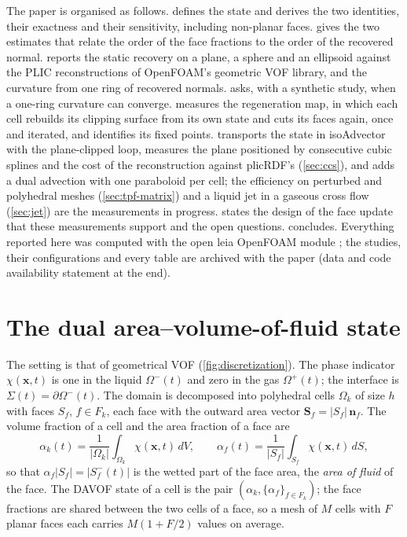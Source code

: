 \documentclass[preprint,12pt]{elsarticle}
\newcommand{\x}{\mathbf{x}}
\newcommand{\n}{\mathbf{n}}
\newcommand{\Sf}{\mathbf{S}_f}
\begin{document}
The paper is organised as follows.  defines the state and derives the two identities, their exactness and their sensitivity, including non-planar faces.  gives the two estimates that relate the order of the face fractions to the order of the recovered normal.  reports the static recovery on a plane, a sphere and an ellipsoid against the PLIC reconstructions of OpenFOAM's geometric VOF library, and the curvature from one ring of recovered normals.  asks, with a synthetic study, when a one-ring curvature can converge.  measures the regeneration map, in which each cell rebuilds its clipping surface from its own state and cuts its faces again, once and iterated, and identifies its fixed points.  transports the state in isoAdvector with the plane-clipped loop, measures the plane positioned by consecutive cubic splines and the cost of the reconstruction against plicRDF's (\cref{sec:ccs}), and adds a dual advection with one paraboloid per cell; the efficiency on perturbed and polyhedral meshes (\cref{sec:tpf-matrix}) and a liquid jet in a gaseous cross flow (\cref{sec:jet}) are the measurements in progress.  states the design of the face update that these measurements support and the open questions.  concludes. Everything reported here was computed with the open leia OpenFOAM module \citep{LeiaRepo2026}; the studies, their configurations and every table are archived with the paper \citep{LeiaRepo2026} (data and code availability statement at the end).

\section{The dual area--volume-of-fluid state}
\label{sec:state}



The setting is that of geometrical VOF (\cref{fig:discretization}). The phase indicator $\chi(\x,t)$ is one in the liquid $\Omega^-(t)$ and zero in the gas $\Omega^+(t)$; the interface is $\Sigma(t) = \partial\Omega^-(t)$. The domain is decomposed into polyhedral cells $\Omega_k$ of size $h$ with faces $S_f$, $f \in F_k$, each face with the outward area vector $\Sf = |S_f|\,\n_f$. The volume fraction of a cell and the area fraction of a face are
\begin{equation}
\alpha_k(t) = \frac{1}{|\Omega_k|}\int_{\Omega_k}\chi(\x,t)\,dV, \qquad
\alpha_f(t) = \frac{1}{|S_f|}\int_{S_f}\chi(\x,t)\,dS,
\label{eq:fractions}
\end{equation}
so that $\alpha_f |S_f| = |S_f^-(t)|$ is the wetted part of the face area, the \emph{area of fluid} of the face. The DAVOF state of a cell is the pair $(\alpha_k, \{\alpha_f\}_{f \in F_k})$; the face fractions are shared between the two cells of a face, so a mesh of $M$ cells with $F$ planar faces each carries $M(1 + F/2)$ values on average.
\end{document}
